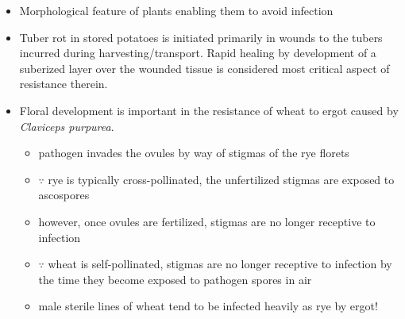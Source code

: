 \documentclass[11pt,dvipsnames,ignorenonframetext,aspectratio=169]{beamer}
\providecommand{\tightlist}{%
  \setlength{\itemsep}{0pt}\setlength{\parskip}{0pt}}
\begin{document}
\begin{frame}{}
\protect\hypertarget{section}{}
\begin{itemize}
\tightlist
\item
  Morphological feature of plants enabling them to avoid infection
\item
  Tuber rot in stored potatoes is initiated primarily in wounds to the
  tubers incurred during harvesting/transport. Rapid healing by
  development of a suberized layer over the wounded tissue is considered
  most critical aspect of resistance therein.
\item
  Floral development is important in the resistance of wheat to ergot
  caused by \textit{Claviceps purpurea}.

  \begin{itemize}
  \tightlist
  \item
    pathogen invades the ovules by way of stigmas of the rye florets
  \item
    \(\because\) rye is typically cross-pollinated, the unfertilized
    stigmas are exposed to ascospores
  \item
    however, once ovules are fertilized, stigmas are no longer receptive
    to infection
  \item
    \(\because\) wheat is self-pollinated, stigmas are no longer
    receptive to infection by the time they become exposed to pathogen
    spores in air
  \item
    male sterile lines of wheat tend to be infected heavily as rye by
    ergot!
  \end{itemize}
\end{itemize}
\end{frame}
\end{document}
